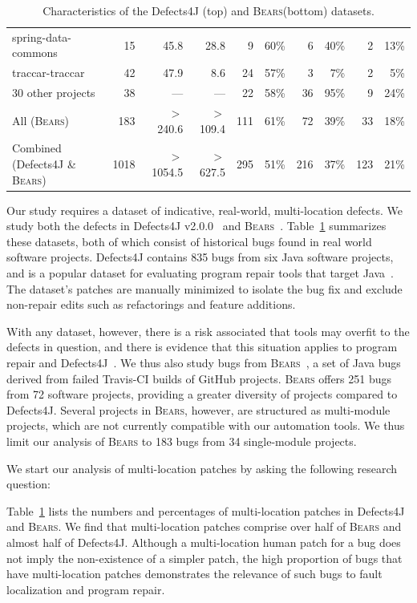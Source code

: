 \documentclass[10pt, conference]{IEEEtran}
\newcommand\bears{\textsc{Bears}\xspace}
\begin{document}
\begin{table}
\begin{center}
\begin{tabular}{l  rrr | rr | rr | rr}
spring-data-commons & 15 & 45.8 & 28.8  & 9 & 60\% & 6 & 40\% & 2 & 13\%\\
traccar-traccar & 42 & 47.9 & 8.6 & 24 & 57\% & 3 & 7\% & 2 & 5\%\\
30 other projects & 38 & --- & --- & 22 & 58\% & 36 & 95\% & 9 & 24\%\\
\midrule
All (\bears) & 183 & $>$240.6 & $>$109.4 & 111 & 61\% & 72 & 39\% & 33 & 18\% \\
\midrule
Combined (Defects4J \& \bears) & 1018 & $>$1054.5 & $>$627.5 & 295 & 51\% & 216 & 37\% & 123 & 21\%\\
\bottomrule
\end{tabular}
\end{center}
\caption{\label{tab:dataset-characteristics} Characteristics of the Defects4J (top) and \bears (bottom) datasets.}
\end{table}

Our study requires a dataset of indicative, real-world,
multi-location defects.  We study both the defects in
Defects4J v2.0.0~\cite{defects4j} and \bears~\cite{bears}.  Table~\ref{tab:dataset-characteristics}
summarizes these datasets, both of which
consist of historical
bugs found in real world software projects. Defects4J contains 835 bugs from 
six Java software projects, and is a popular dataset for evaluating 
program repair tools that target Java~\cite{durieux-repair-them-all}.
The dataset's patches are manually minimized to isolate the bug fix 
and exclude non-repair edits such as refactorings and feature additions.

With any dataset, however, there is a risk associated that tools may overfit
to the defects in question, and there is evidence that this situation applies to
program repair and Defects4J~\cite{durieux-repair-them-all}. 
We thus also study bugs from \bears~\cite{bears}, 
a set of Java bugs derived from failed Travis-CI builds of GitHub projects. 
\bears offers 251 bugs from 72 software projects, providing a greater diversity of 
projects compared to Defects4J. 
Several projects in \bears, however, are structured as multi-module projects, 
which are not currently compatible with our automation tools.
We thus limit our analysis of \bears to 183 bugs from 34 single-module projects.


We start our analysis of multi-location patches by asking the following research question:

Table~\ref{tab:dataset-characteristics} lists the numbers and percentages of
multi-location patches in Defects4J and \bears. 
We find that multi-location patches comprise over half of \bears and almost half of Defects4J.
Although a multi-location human patch for a bug does not imply the 
non-existence of a simpler patch, the high proportion of bugs that have 
multi-location patches demonstrates the relevance of such bugs to fault localization and
program repair. 
\end{document}
